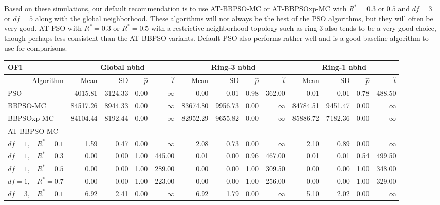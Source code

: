 \documentclass[12pt]{article}
\begin{document}
Based on these simulations, our default recommendation is to use AT-BBPSO-MC or AT-BBPSOxp-MC with $R^*=0.3$ or $0.5$ and $df=3$ or $df=5$ along with the global neighborhood. These algorithms will not always be the best of the PSO algorithms, but they will often be very good. AT-PSO with $R^*=0.3$ or $R^*=0.5$ with a restrictive neighborhood topology such as ring-3 also tends to be a very good choice, though perhaps less consistent than the AT-BBPSO variants. Default PSO also performs rather well and is a good baseline algorithm to use for comparisons.


\begin{table}[ht]
\centering
\tiny{
\begin{tabular}{r|rrrr|rrrr|rrrr}
\multicolumn{1}{l}{OF1} & \multicolumn{4}{c}{Global nbhd} & \multicolumn{4}{c}{Ring-3 nbhd} & \multicolumn{4}{c}{Ring-1 nbhd}\\
\hline
Algorithm & Mean & SD & $\widehat{p}$ & $\widehat{t}$ & Mean & SD & $\widehat{p}$ & $\widehat{t}$ & Mean & SD & $\widehat{p}$ & $\widehat{t}$ \\
  \hline
\multicolumn{1}{l|}{PSO} & 4015.81 & 3124.33 & 0.00 & $\infty$ & 0.00 & 0.01 & 0.98 & 362.00 & 0.01 & 0.01 & 0.78 & 488.50 \\ 
  \multicolumn{1}{l|}{BBPSO-MC} & 84517.26 & 8944.33 & 0.00 & $\infty$ & 83674.80 & 9956.73 & 0.00 & $\infty$ & 84784.51 & 9451.47 & 0.00 & $\infty$ \\ 
  \multicolumn{1}{l|}{BBPSOxp-MC} & 84104.44 & 8192.44 & 0.00 & $\infty$ & 82952.29 & 9655.82 & 0.00 & $\infty$ & 85886.72 & 7182.36 & 0.00 & $\infty$ \\ 
\hline
\multicolumn{1}{l|}{AT-BBPSO-MC} &&&&&&&&&&&&\\
  $df = 1,\enspace$ $R^* =0.1$ & 1.59 & 0.47 & 0.00 & $\infty$ & 2.08 & 0.73 & 0.00 & $\infty$ & 2.10 & 0.89 & 0.00 & $\infty$ \\ 
  $df = 1,\enspace$ $R^* =0.3$ & 0.00 & 0.00 & 1.00 & 445.00 & 0.01 & 0.00 & 0.96 & 467.00 & 0.01 & 0.01 & 0.54 & 499.50 \\ 
  $df = 1,\enspace$ $R^* =0.5$ & 0.00 & 0.00 & 1.00 & 289.00 & 0.00 & 0.00 & 1.00 & 309.50 & 0.00 & 0.00 & 1.00 & 348.00 \\ 
  $df = 1,\enspace$ $R^* =0.7$ & 0.00 & 0.00 & 1.00 & 223.00 & 0.00 & 0.00 & 1.00 & 256.00 & 0.00 & 0.00 & 1.00 & 329.00 \\ 
  $df = 3,\enspace$ $R^* =0.1$ & 6.92 & 2.41 & 0.00 & $\infty$ & 6.92 & 1.79 & 0.00 & $\infty$ & 5.10 & 2.02 & 0.00 & $\infty$ \\ 

\end{tabular}}
\end{table}
\end{document}
